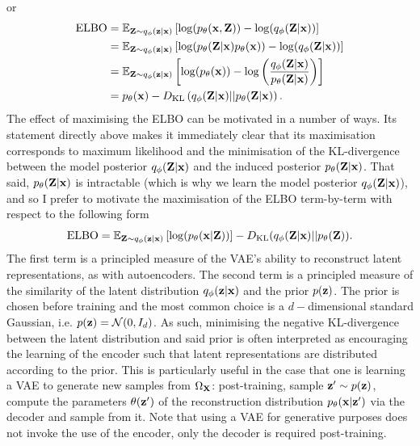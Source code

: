 \documentclass[11pt]{article}
\begin{document}
or
\begin{align*}
    \text{ELBO}
    &=
    \mathbb{E}_{\mathbf{Z}\sim q_{\phi}(\mathbf{z}|\mathbf{x})}\left[\log(p_{\theta}(\mathbf{x},\mathbf{Z}))-\log(q_{\phi}(\mathbf{Z}|\mathbf{x}))\right]\\
    &=
    \mathbb{E}_{\mathbf{Z}\sim q_{\phi}(\mathbf{z}|\mathbf{x})}\left[\log(p_{\theta}(\mathbf{Z}|\mathbf{x})p_{\theta}(\mathbf{x}))-\log(q_{\phi}(\mathbf{Z}|\mathbf{x}))\right]\\
    &=
    \mathbb{E}_{\mathbf{Z}\sim q_{\phi}(\mathbf{z}|\mathbf{x})}\left[\log(p_{\theta}(\mathbf{x}))-\log\left(\frac{q_{\phi}(\mathbf{Z}|\mathbf{x})}{p_{\theta}(\mathbf{Z}|\mathbf{x})}\right)\right]\\
    &=
    p_{\theta}(\mathbf{x})-D_{\text{KL}}\left(q_{\phi}(\mathbf{Z}|\mathbf{x})||p_{\theta}(\mathbf{Z}|\mathbf{x})\right).
    \label{eq:vae-elbo-3}
\end{align*}
The effect of maximising the ELBO can be motivated in a number of ways. Its statement directly above makes it immediately clear that its maximisation corresponds to maximum likelihood and the minimisation of the KL-divergence between the model posterior $q_{\phi}(\mathbf{Z}|\mathbf{x})$ and the induced posterior $p_{\theta}(\mathbf{Z}|\mathbf{x})$. That said, $p_{\theta}(\mathbf{Z}|\mathbf{x})$ is intractable (which is why we learn the model posterior $q_{\phi}(\mathbf{Z}|\mathbf{x})$), and so I prefer to motivate the maximisation of the ELBO term-by-term with respect to the following form
$$
\text{ELBO}
=
\mathbb{E}_{\mathbf{Z}\sim q_{\phi}(\mathbf{z}|\mathbf{x})}\left[\log(p_{\theta}(\mathbf{x}|\mathbf{Z}))\right]-D_{\text{KL}}(q_{\phi}(\mathbf{Z}|\mathbf{x})||p_{\theta}(\mathbf{Z})).
$$
The first term is a principled measure of the VAE's ability to reconstruct latent representations, as with autoencoders. The second term is a principled measure of the similarity of the latent distribution $q_{\phi}(\mathbf{z}|\mathbf{x})$ and the prior $p(\mathbf{z})$. The prior is chosen before training and the most common choice is a $d-$dimensional standard Gaussian, i.e. $p(\mathbf{z})=\mathcal{N}(0,I_d)$. As such, minimising the negative KL-divergence between the latent distribution and said prior is often interpreted as encouraging the learning of the encoder such that latent representations are distributed according to the prior. This is particularly useful in the case that one is learning a VAE to generate new samples from $\Omega_{\mathbf{X}}$: post-training, sample $\mathbf{z}'\sim p(\mathbf{z})$, compute the parameters $\theta(\mathbf{z}')$ of the reconstruction distribution $p_{\theta}(\mathbf{x}|\mathbf{z}')$ via the decoder and sample from it. Note that using a VAE for generative purposes does not invoke the use of the encoder, only the decoder is required post-training.
\end{document}
